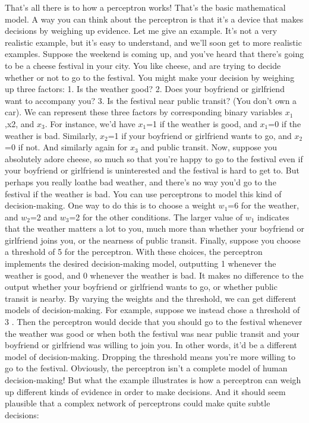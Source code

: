 That's all there is to how a perceptron works!
That's the basic mathematical model. A way you can think about the perceptron is that it's a device that makes decisions by weighing up evidence. Let me give an example. It's not a very realistic example, but it's easy to understand, and we'll soon get to more realistic examples. Suppose the weekend is coming up, and you've heard that there's going to be a cheese festival in your city. You like cheese, and are trying to decide whether or not to go to the festival. You might make your decision by weighing up three factors: 
1. Is the weather good? 
2. Does your boyfriend or girlfriend want to accompany you? 
3. Is the festival near public transit? (You don't own a car). 
We can represent these three factors by corresponding binary variables $x_1$,x2, and $x_3$. For instance, we'd have $x_1$=1 if the weather is good, and $x_1$=0 if the weather is bad. Similarly, $x_2$=1 if your boyfriend or girlfriend wants to go, and $x_2$=0 if not. And similarly again for $x_3$ and public transit.
Now, suppose you absolutely adore cheese, so much so that you're happy to go to the festival even if your boyfriend or girlfriend is uninterested and the festival is hard to get to. But perhaps you really loathe bad weather, and there's no way you'd go to the festival if the weather is bad. You can use perceptrons to model this kind of decision-making. One way to do this is to choose a weight $w_1$=6 for the weather, and $w_2$=2 and $w_3$=2 for the other conditions. The larger value of $w_1$ indicates that the weather matters a lot to you, much more than whether your boyfriend or girlfriend joins you, or the nearness of public transit. Finally, suppose you choose a threshold of 5 for the perceptron. With these choices, the perceptron implements the desired decision-making model, outputting 1 whenever the weather is good, and 0 whenever the weather is bad. It makes no difference to the output whether your boyfriend or girlfriend wants to go, or whether public transit is nearby.
By varying the weights and the threshold, we can get different models of decision-making. For example, suppose we instead chose a threshold of 3 . Then the perceptron would decide that you should go to the festival whenever the weather was good or when both the festival was near public transit and your boyfriend or girlfriend was willing to join you. In other words, it'd be a different model of decision-making. Dropping the threshold means you're more willing to go to the festival.
Obviously, the perceptron isn't a complete model of human decision-making! But what the example illustrates is how a perceptron can weigh up different kinds of evidence in order to make decisions. And it should seem plausible that a complex network of perceptrons could make quite subtle decisions: 

